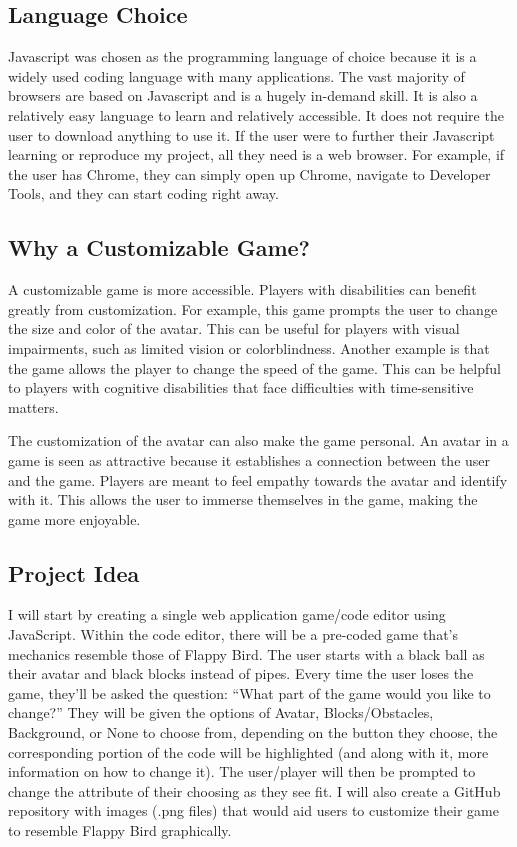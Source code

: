 \documentclass[10pt,twocolumn]{article}
\begin{document}
\subsection{Language Choice}
Javascript was chosen as the programming language of choice because it is a widely used coding language with many applications. The vast majority of browsers are based on Javascript and is a hugely in-demand skill. It is also a relatively easy language to learn and relatively accessible. It does not require the user to download anything to use it. If the user were to further their Javascript learning or reproduce my project, all they need is a web browser. For example, if the user has Chrome, they can simply open up Chrome, navigate to Developer Tools, and they can start coding right away.


\subsection{Why a Customizable Game?}
A customizable game is more accessible. Players with disabilities can benefit greatly from customization. For example, this game prompts the user to change the size and color of the avatar. This can be useful for players with visual impairments, such as limited vision or colorblindness. Another example is that the game allows the player to change the speed of the game. This can be helpful to players with cognitive disabilities that face difficulties with time-sensitive matters.

The customization of the avatar can also make the game personal. An avatar in a game is seen as attractive because it establishes a connection between the user and the game. Players are meant to feel empathy towards the avatar and identify with it. This allows the user to immerse themselves in the game, making the game more enjoyable. 

\subsection{Project Idea}
I will start by creating a single web application game/code editor using JavaScript. Within the code editor, there will be a pre-coded game that’s mechanics resemble those of Flappy Bird. The user starts with a black ball as their avatar and black blocks instead of pipes. Every time the user loses the game, they’ll be asked the question: “What part of the game would you like to change?” They will be given the options of Avatar, Blocks/Obstacles, Background, or None to choose from, depending on the button they choose, the corresponding portion of the code will be highlighted (and along with it, more information on how to change it). The user/player will then be prompted to change the attribute of their choosing as they see fit. I will also create a GitHub repository with images (.png files) that would aid users to customize their game to resemble Flappy Bird graphically. 
\end{document}
